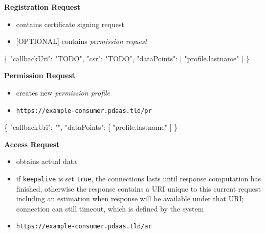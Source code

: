 \documentclass[12pt,english,a4paper,titlepage,cleardoublepage=empty,dottedtoc]{report}
\newenvironment{Shaded}{\begin{snugshade}}{\end{snugshade}}
\newcommand{\DataTypeTok}[1]{\textcolor[rgb]{0.13,0.29,0.53}{{#1}}}
\newcommand{\StringTok}[1]{\textcolor[rgb]{0.31,0.60,0.02}{{#1}}}
\newcommand{\OtherTok}[1]{\textcolor[rgb]{0.56,0.35,0.01}{{#1}}}
\newcommand{\FunctionTok}[1]{\textcolor[rgb]{0.00,0.00,0.00}{{#1}}}
\providecommand{\tightlist}{%
  \setlength{\itemsep}{0pt}\setlength{\parskip}{0pt}}
\begin{document}
\textbf{Registration Request}

\begin{itemize}
\tightlist
\item
  contains certificate signing request
\item
  {[}OPTIONAL{]} contains \emph{permission request}
\end{itemize}

\begin{Shaded}
\begin{Highlighting}[numbers=left,,]
\FunctionTok{\{}
    \DataTypeTok{"callbackUri"}\FunctionTok{:} \StringTok{"TODO"}\FunctionTok{,}
    \DataTypeTok{"csr"}\FunctionTok{:} \StringTok{"TODO"}\FunctionTok{,}
    \DataTypeTok{"dataPoints"}\FunctionTok{:} \OtherTok{[}
        \StringTok{"profile.lastname"}
    \OtherTok{]}
\FunctionTok{\}}
\end{Highlighting}
\end{Shaded}

\textbf{Permission Request}

\begin{itemize}
\tightlist
\item
  creates new \emph{permission profile}
\item
  \texttt{https://example-consumer.pdaas.tld/pr}
\end{itemize}

\begin{Shaded}
\begin{Highlighting}[numbers=left,,]
\FunctionTok{\{}
    \DataTypeTok{"callbackUri"}\FunctionTok{:} \StringTok{""}\FunctionTok{,}
    \DataTypeTok{"dataPoints"}\FunctionTok{:} \OtherTok{[}
        \StringTok{"profile.lastname"}
    \OtherTok{]}
\FunctionTok{\}}
\end{Highlighting}
\end{Shaded}

\textbf{Access Request}

\begin{itemize}
\tightlist
\item
  obtains actual data
\item
  if \texttt{keepalive} is set \texttt{true}, the connections lasts
  until response computation has finished, otherwise the response
  contains a URI unique to this current request including an estimation
  when response will be available under that URI; connection can still
  timeout, which is defined by the system
\item
  \texttt{https://example-consumer.pdaas.tld/ar}
\end{itemize}
\end{document}
